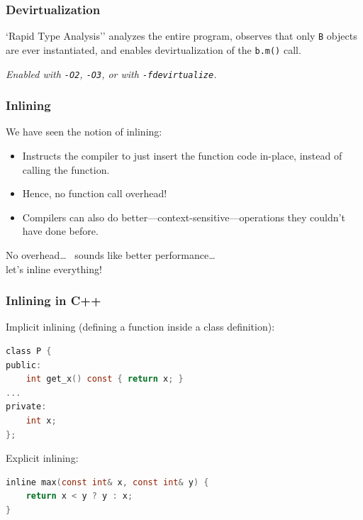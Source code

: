 \begin{frame}
\frametitle{Devirtualization}

`Rapid Type Analysis'' analyzes the entire program, observes that
only {\tt B} objects are ever instantiated, and enables devirtualization
of the {\tt b.m()} call.

\emph{Enabled with {\tt -O2}, {\tt -O3}, or with {\tt -fdevirtualize}.}

\end{frame}

\begin{frame}
  \frametitle{Inlining}

  

  We have seen the notion of inlining:
  \begin{itemize}
    \item Instructs the compiler to just insert the function code in-place,
      instead of calling the function.
    \item Hence, no function call overhead!
    \item Compilers can also do better---context-sensitive---operations they couldn't
      have done before.
  \end{itemize}
  \vfill
  No overhead\ldots~ sounds like better performance\ldots~ \\let's inline everything!
  
\end{frame}

\begin{frame}[fragile]
  \frametitle{Inlining in C++}

  
  Implicit inlining (defining a function inside a class definition):
  \begin{lstlisting}[language=C]
class P {
public:
    int get_x() const { return x; }
...
private:
    int x;
};
  \end{lstlisting}
  \vfill
Explicit inlining:
  \begin{lstlisting}[language=C]
inline max(const int& x, const int& y) {
    return x < y ? y : x;
}
  \end{lstlisting}
  
\end{frame}

